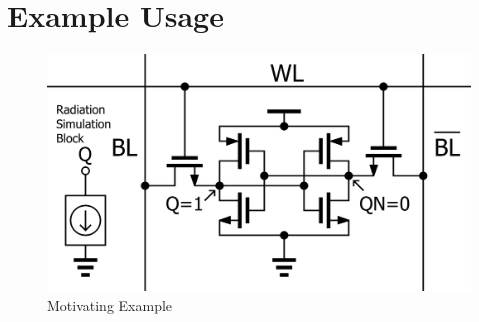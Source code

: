 \documentclass[conference]{IEEEtran}
\begin{document}






	\section{Example Usage}\label{sec:example-usage}
	\begin{figure}[htbp]
        \centering
        \includegraphics[width=0.95\linewidth]{sram_circuit}
        \caption{Motivating Example}
        \label{fig:motivating_example}
    \end{figure}    
    
\end{document}

